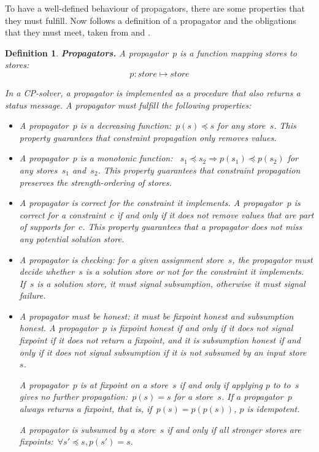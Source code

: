 \documentclass[a4paper,11pt]{article}
\newtheorem{definition}{Definition}
\numberwithin{equation}{section}
\begin{document}
To have a well-defined behaviour of propagators, there are some properties that
they must fulfill. Now follows a definition of a propagator and the obligations
that they must meet, taken from \cite{SchulteCarlsson:FDsys} and \cite{Gecode:MPG}.

\begin{definition} \label{def:prop}
  \textbf{Propagators.} A \emph{propagator}~$p$ is a function mapping stores to stores:
  \begin{equation*}
    p: store \mapsto store
  \end{equation*}

  In a CP-solver, a propagator is implemented as a procedure that also returns 
  a \emph{status message}. A propagator must fulfill the following properties:

  \begin{itemize}
  \item A propagator~$p$ is a decreasing function:~$p(s) \preceq s$ for any store~$s$.
    This property guarantees that constraint propagation only removes values.

  \item A propagator~$p$ is a monotonic function:
    ~$s_1 \preceq s_2 \Rightarrow p(s_1) \preceq p(s_2)$
    for any stores~$s_1$ and~$s_2$. This property guarantees that constraint propagation
    preserves the strength-ordering of stores.

  \item A propagator is correct for the constraint it implements.
    A propagator~$p$
    is correct for a constraint~$c$ if and only if it does not
    remove values that are part of supports for~$c$.
    This property guarantees that a propagator does not miss any potential 
    solution store.

  \item A propagator is \emph{checking}: for a given assignment store~$s$, the propagator
    must decide whether~$s$ is a solution store or not for the constraint it
    implements. If~$s$ is a solution store, it must signal subsumption, otherwise
    it must signal failure.

  \item A propagator must be \emph{honest}: it must be 
    \emph{fixpoint honest} and \emph{subsumption honest}. 
    A propagator~$p$ is fixpoint honest if and only if it does not signal 
    fixpoint if it does not return a fixpoint, and it is subsumption honest
    if and only if it does
    not signal subsumption if it is not subsumed by an input store~$s$.
    
    A propagator~$p$ is at \emph{fixpoint} on a store~$s$ if and only if applying 
    $p$ to to~$s$ gives no further propagation:~$p(s) = s$ for
    a store~$s$. If a propagator~$p$ always returns a fixpoint, that is, 
    if~$p(s) = p(p(s))$, $p$ is \emph{idempotent}.

    A propagator is \emph{subsumed} by a store~$s$ if and only if
    all stronger stores are fixpoints:~$\forall s'\preceq s,p(s')=s$.

\end{itemize}

\end{definition}
\end{document}
